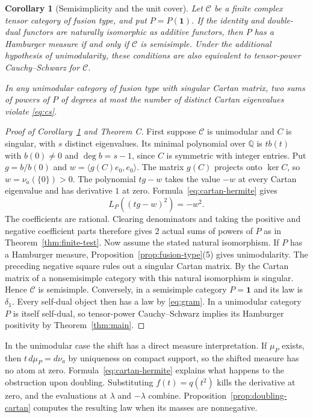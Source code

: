 \documentclass[11pt,reqno]{amsart}
\newtheorem{corollary}[theorem]{Corollary}
\theoremstyle{definition}
\newcommand{\one}{\mathbf 1}
\newcommand{\C}{\mathcal C}
\begin{document}
\begin{corollary}[Semisimplicity and the unit cover]\label{cor:cartan-failure}
Let $\C$ be a finite complex tensor category of fusion type, and put $P=P(\one)$. If the identity and double-dual functors are naturally isomorphic as additive functors, then $P$ has a Hamburger measure if and only if $\C$ is semisimple. Under the additional hypothesis of unimodularity, these conditions are also equivalent to tensor-power Cauchy--Schwarz for $\C$.

In any unimodular category of fusion type with singular Cartan matrix, two sums of powers of $P$ of degrees at most the number of distinct Cartan eigenvalues violate \eqref{eq:cs}.
\end{corollary}
\begin{proof}[Proof of Corollary~\ref{cor:cartan-failure} and Theorem C]
First suppose $\C$ is unimodular and $C$ is singular, with $s$ distinct eigenvalues. Its minimal polynomial over $\mathbb Q$ is
$t b(t)$ with $b(0)\ne0$ and $\deg b=s-1$, since $C$ is symmetric with
integer entries. Put $g=b/b(0)$ and $w=\langle g(C)e_0,e_0\rangle$.
The matrix $g(C)$ projects onto $\ker C$, so $w=\nu_a(\{0\})>0$.
The polynomial $tg-w$ takes the value $-w$ at every Cartan eigenvalue and has derivative $1$ at zero. Formula~\eqref{eq:cartan-hermite} gives
\[
                          L_P((tg-w)^2)=-w^2 .
\]
The coefficients are rational. Clearing denominators and taking the
positive and negative coefficient parts therefore gives 2 actual sums
of powers of $P$ as in Theorem~\ref{thm:finite-test}.
Now assume the stated natural isomorphism. If $P$ has a Hamburger measure, Proposition~\ref{prop:fusion-type}(5) gives unimodularity. The preceding negative square rules out a singular Cartan matrix. By \cite[Theorem~6.6.1]{EGNO} the Cartan matrix of a nonsemisimple category with this natural isomorphism is singular. Hence $\C$ is semisimple. Conversely, in a semisimple category $P=\one$ and its law is $\delta_1$. Every self-dual object then has a law by \eqref{eq:gram}. In a unimodular category $P$ is itself self-dual, so tensor-power Cauchy--Schwarz implies its Hamburger positivity by Theorem~\ref{thm:main}.
\end{proof}

In the unimodular case the shift has a direct measure interpretation. If $\mu_P$ exists, then $t\,d\mu_P=d\nu_a$ by uniqueness on compact support, so the shifted measure has no atom at zero. Formula~\eqref{eq:cartan-hermite} explains what happens to the obstruction upon doubling. Substituting $f(t)=q(t^2)$ kills the derivative at zero, and the evaluations at $\lambda$ and $-\lambda$ combine. Proposition~\ref{prop:doubling-cartan} computes the resulting law when its masses are nonnegative.
\end{document}
